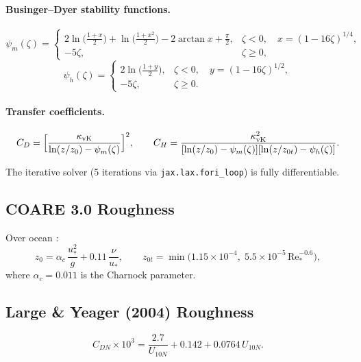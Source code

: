 \documentclass[11pt,twoside]{report}
\begin{document}
\paragraph{Businger--Dyer stability functions.}
\begin{equation}
  \psi_m(\zeta) = \begin{cases}
    2\ln\!\bigl(\frac{1+x}{2}\bigr)+\ln\!\bigl(\frac{1+x^2}{2}\bigr)
    -2\arctan x+\frac{\pi}{2}, & \zeta<0,\quad x=(1-16\zeta)^{1/4}, \\[4pt]
    -5\zeta, & \zeta\ge 0,
  \end{cases}
\end{equation}
\begin{equation}
  \psi_h(\zeta) = \begin{cases}
    2\ln\!\bigl(\frac{1+y}{2}\bigr), & \zeta<0,\quad y=(1-16\zeta)^{1/2}, \\[4pt]
    -5\zeta, & \zeta\ge 0.
  \end{cases}
\end{equation}

\paragraph{Transfer coefficients.}
\begin{equation}
  C_D = \Bigl[\frac{\kappa_{\mathrm{vK}}}
  {\ln(z/z_0)-\psi_m(\zeta)}\Bigr]^2, \qquad
  C_H = \frac{\kappa_{\mathrm{vK}}^2}
  {[\ln(z/z_0)-\psi_m(\zeta)][\ln(z/z_{0t})-\psi_h(\zeta)]}.
\end{equation}

The iterative solver (5 iterations via \texttt{jax.lax.fori\_loop}) is
fully differentiable.

\subsection{COARE 3.0 Roughness}

Over ocean \citep{Fairall2003}:
\begin{equation}
  z_0 = \alpha_c\,\frac{u_*^2}{g}+0.11\,\frac{\nu}{u_*},
  \qquad
  z_{0t} = \min\!\bigl(1.15\times10^{-4},\;
  5.5\times10^{-5}\,\mathrm{Re}_*^{-0.6}\bigr),
\end{equation}
where $\alpha_c=0.011$ is the Charnock parameter.

\subsection{Large \& Yeager (2004) Roughness}
\begin{equation}
  C_{DN}\times10^3 = \frac{2.7}{U_{10N}}+0.142+0.0764\,U_{10N}.
\end{equation}
\end{document}
